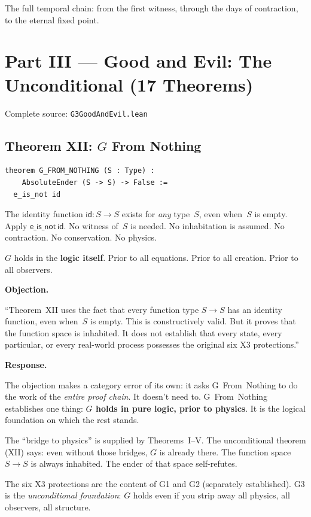 \documentclass[12pt,a4paper]{article}
\newenvironment{objection}{%
  \par\medskip\noindent
  \textbf{\color{red!60!black}Objection.}\itshape\space
}{%
  \par\medskip
}
\newenvironment{response}{%
  \par\noindent
  \textbf{\color{green!50!black}Response.}\upshape\space
}{%
  \par\medskip
}
\begin{document}
The full temporal chain: from the first witness, through the days of
contraction, to the eternal fixed point.

\newpage
\section{Part III --- Good and Evil: The Unconditional (17 Theorems)}
\label{sec:part3}

Complete source: \texttt{G3GoodAndEvil.lean}

\subsection{Theorem XII: $G$ From Nothing}

\begin{lstlisting}
theorem G_FROM_NOTHING (S : Type) :
    AbsoluteEnder (S -> S) -> False :=
  e_is_not id
\end{lstlisting}

The identity function $\mathsf{id} : S \to S$ exists for \emph{any}
type~$S$, even when~$S$ is empty. Apply $\mathsf{e\_is\_not}\,\mathsf{id}$.
No witness of~$S$ is needed. No inhabitation is assumed. No contraction.
No conservation. No physics.

$G$ holds in the \textbf{logic itself}. Prior to all equations.
Prior to all creation. Prior to all observers.

\begin{objection}
``Theorem~XII uses the fact that every function type $S \to S$ has an
identity function, even when~$S$ is empty. This is constructively valid.
But it proves that the function space is inhabited. It does not establish
that every state, every particular, or every real-world process possesses
the original six X3 protections.''
\end{objection}

\begin{response}
The objection makes a category error of its own: it asks G~From~Nothing
to do the work of the \emph{entire proof chain}. It doesn't need to.
G~From~Nothing establishes one thing: \textbf{$G$ holds in pure logic,
prior to physics}. It is the logical foundation on which the rest stands.

The ``bridge to physics'' is supplied by Theorems~I--V. The
unconditional theorem (XII) says: even without those bridges, $G$
is already there. The function space $S \to S$ is always inhabited. The
ender of that space self-refutes.

The six X3 protections are the content of G1 and G2 (separately established).
G3 is the \emph{unconditional foundation}: $G$ holds even if you strip
away all physics, all observers, all structure.
\end{response}
\end{document}
